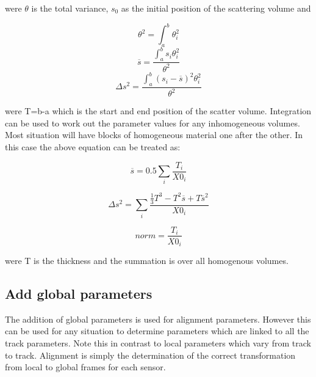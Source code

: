 were $\theta$ is the total variance, $s_0$ as the initial position of the scattering volume and 

\begin{multicols}{3}
\begin{equation}
\theta^{2} = \int_{a}^{b} \theta_{i}^{2}
\end{equation}
\begin{equation}
\overline{s}=\frac{\int_{a}^{b} s_i \theta_{i}^{2}}{\theta^2}
\end{equation}
\begin{equation}
\Delta s^{2} = \frac{\int_{a}^{b} ( s_i  - \overline{s})^2 \theta^{2}_{i}}{\theta^2}
\end{equation}
\end{multicols}

were T=b-a which is the start and end position of the scatter volume. 
Integration can be used to work out the parameter values for any inhomogeneous volumes. Most situation will have blocks of homogeneous material one after the other. In this case the above equation can be treated as: 

\begin{equation}
 \overline{s} = 0.5 \sum_i \frac{T_i}{X0_i} 
\end{equation}

\begin{equation}
 \Delta s^{2} = \sum_i \frac{\frac{1}{3} T^3 - T^{2}\overline{s} + T\overline{s}^{2}}{X0_i} 
\end{equation}

\begin{equation}
 norm =   \frac{T_i}{X0_i} 
\end{equation}

were T is the thickness and the summation is over all homogenous volumes.  



\subsection{Add global parameters}
\label{gloPar}
The addition of global parameters is used for alignment parameters. However this can be used for any situation to determine parameters which are linked to all the track parameters. Note this in contrast to local parameters which vary from track to track.  Alignment is simply the determination of the correct transformation from local to global frames for each sensor. 

